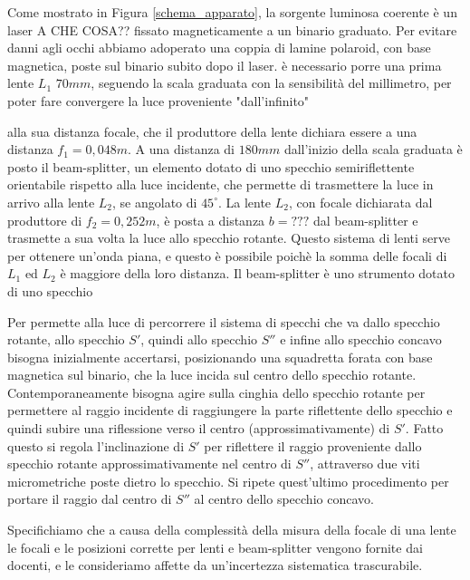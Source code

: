 \documentclass{article}
\begin{document}
Come mostrato in Figura \ref{schema_apparato}, la sorgente luminosa coerente è un laser A CHE COSA?? fissato magneticamente a un binario graduato. Per evitare danni agli
occhi abbiamo adoperato una coppia di lamine polaroid, con base magnetica, poste sul binario subito dopo il laser.
è necessario porre una prima lente $L_1$ $70 mm$, seguendo la scala graduata con la sensibilità del millimetro, per poter fare convergere la luce proveniente "dall'infinito"
 alla sua distanza focale, che il produttore 
della lente dichiara essere a una distanza $f_1 = 0,048 m$. A una distanza di $180mm$ dall'inizio della scala graduata è posto il beam-splitter, un elemento dotato di uno
specchio semiriflettente orientabile rispetto alla luce incidente, che permette di trasmettere la luce in arrivo alla lente $L_2$, se angolato di $45^\circ$. La lente $L_2$, con 
focale dichiarata dal produttore di $f_2=0,252m$, è posta a distanza $b = ???$ dal beam-splitter e trasmette a sua volta la luce allo specchio rotante. 
Questo sistema di lenti serve per ottenere un'onda piana, e questo è possibile poichè la somma delle focali di $L_1$ ed $L_2$ è maggiore della loro distanza. 
Il beam-splitter è uno strumento dotato di uno specchio


Per permette alla luce di percorrere il sistema di specchi che va dallo specchio rotante, allo specchio $S'$, quindi allo specchio $S''$ e infine allo specchio concavo 
bisogna inizialmente accertarsi, posizionando una squadretta forata con base magnetica sul binario, che la luce incida sul centro dello specchio rotante.
Contemporaneamente bisogna agire sulla cinghia dello specchio rotante per permettere al raggio incidente di raggiungere la parte riflettente dello specchio e quindi 
subire una riflessione verso il centro (approssimativamente) di $S'$.
Fatto questo si regola l'inclinazione di $S'$ per riflettere il raggio proveniente dallo specchio rotante approssimativamente nel centro di $S''$, attraverso due
viti micrometriche poste dietro lo specchio. Si ripete quest'ultimo procedimento per portare il raggio dal centro di $S''$ al centro dello specchio concavo.

Specifichiamo che a causa della complessità della misura della focale di una lente le focali e le posizioni corrette per lenti e beam-splitter vengono fornite dai 
docenti, e le consideriamo affette da un'incertezza sistematica trascurabile.
\end{document}

